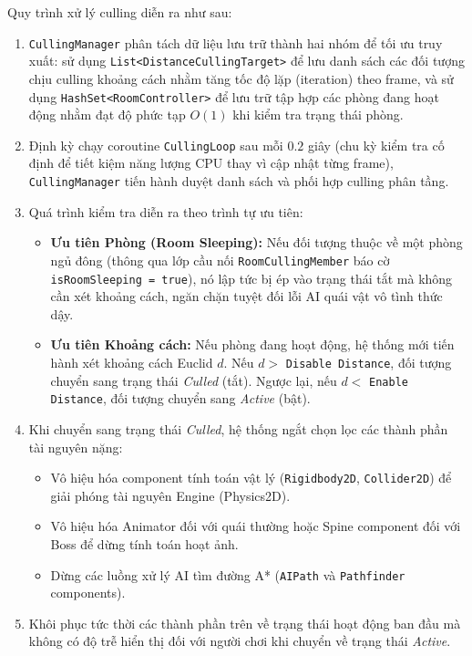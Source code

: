 Quy trình xử lý culling diễn ra như sau:
\begin{enumerate}
    \item \texttt{CullingManager} phân tách dữ liệu lưu trữ thành hai nhóm để tối ưu truy xuất: sử dụng \texttt{List<DistanceCullingTarget>} để lưu danh sách các đối tượng chịu culling khoảng cách nhằm tăng tốc độ lặp (iteration) theo frame, và sử dụng \texttt{HashSet<RoomController>} để lưu trữ tập hợp các phòng đang hoạt động nhằm đạt độ phức tạp $O(1)$ khi kiểm tra trạng thái phòng.
    \item Định kỳ chạy coroutine \texttt{CullingLoop} sau mỗi $0.2$ giây (chu kỳ kiểm tra cố định để tiết kiệm năng lượng CPU thay vì cập nhật từng frame), \texttt{CullingManager} tiến hành duyệt danh sách và phối hợp culling phân tầng.
    \item Quá trình kiểm tra diễn ra theo trình tự ưu tiên:
    \begin{itemize}
        \item \textbf{Ưu tiên Phòng (Room Sleeping):} Nếu đối tượng thuộc về một phòng ngủ đông (thông qua lớp cầu nối \texttt{RoomCullingMember} báo cờ \texttt{isRoomSleeping = true}), nó lập tức bị ép vào trạng thái tắt mà không cần xét khoảng cách, ngăn chặn tuyệt đối lỗi AI quái vật vô tình thức dậy.
        \item \textbf{Ưu tiên Khoảng cách:} Nếu phòng đang hoạt động, hệ thống mới tiến hành xét khoảng cách Euclid $d$. Nếu $d >$ \texttt{Disable Distance}, đối tượng chuyển sang trạng thái \textit{Culled} (tắt). Ngược lại, nếu $d <$ \texttt{Enable Distance}, đối tượng chuyển sang \textit{Active} (bật).
    \end{itemize}
    \item Khi chuyển sang trạng thái \textit{Culled}, hệ thống ngắt chọn lọc các thành phần tài nguyên nặng:
    \begin{itemize}
        \item Vô hiệu hóa component tính toán vật lý (\texttt{Rigidbody2D}, \texttt{Collider2D}) để giải phóng tài nguyên Engine (Physics2D).
        \item Vô hiệu hóa Animator đối với quái thường hoặc Spine component đối với Boss để dừng tính toán hoạt ảnh.
        \item Dừng các luồng xử lý AI tìm đường A* (\texttt{AIPath} và \texttt{Pathfinder} components).
    \end{itemize}
    \item Khôi phục tức thời các thành phần trên về trạng thái hoạt động ban đầu mà không có độ trễ hiển thị đối với người chơi khi chuyển về trạng thái \textit{Active}.
\end{enumerate}

